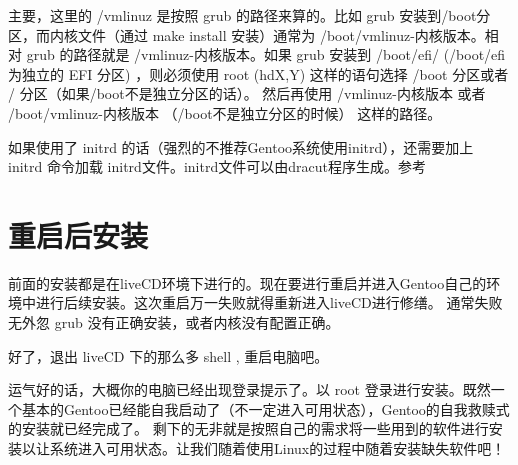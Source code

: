 主要，这里的 /vmlinuz 是按照 grub 的路径来算的。比如 grub 安装到/boot分区，而内核文件（通过 make install 安装）通常为 /boot/vmlinuz-内核版本。相对 grub 的路径就是 /vmlinuz-内核版本。如果 grub 安装到 /boot/efi/ (/boot/efi 为独立的 EFI 分区) ，则必须使用 root (hdX,Y) 这样的语句选择 /boot 分区或者 / 分区（如果/boot不是独立分区的话）。
然后再使用 /vmlinuz-内核版本 或者 /boot/vmlinuz-内核版本 （/boot不是独立分区的时候） 这样的路径。

如果使用了 initrd 的话（强烈的不推荐Gentoo系统使用initrd），还需要加上 initrd 命令加载 initrd文件。initrd文件可以由dracut程序生成。参考 

\section{重启后安装}

前面的安装都是在liveCD环境下进行的。现在要进行重启并进入Gentoo自己的环境中进行后续安装。这次重启万一失败就得重新进入liveCD进行修缮。
通常失败无外忽 grub 没有正确安装，或者内核没有配置正确。

好了，退出 liveCD 下的那么多 shell , 重启电脑吧。

运气好的话，大概你的电脑已经出现登录提示了。以 root 登录进行安装。既然一个基本的Gentoo已经能自我启动了（不一定进入可用状态），Gentoo的自我救赎式的安装就已经完成了。
剩下的无非就是按照自己的需求将一些用到的软件进行安装以让系统进入可用状态。让我们随着使用Linux的过程中随着安装缺失软件吧！

